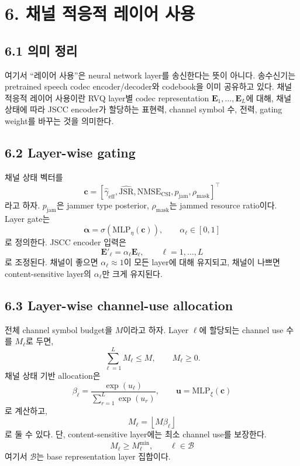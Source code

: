 \documentclass[11pt,a4paper]{article}
\begin{document}
\section{6. 채널 적응적 레이어 사용}

\subsection{6.1 의미 정리}
여기서 ``레이어 사용''은 neural network layer를 송신한다는 뜻이 아니다. 송수신기는 pretrained speech codec encoder/decoder와 codebook을 이미 공유하고 있다. 채널 적응적 레이어 사용이란 RVQ layer별 codec representation $\bm{E}_1,\ldots,\bm{E}_L$에 대해, 채널 상태에 따라 JSCC encoder가 할당하는 표현력, channel symbol 수, 전력, gating weight를 바꾸는 것을 의미한다.

\subsection{6.2 Layer-wise gating}
채널 상태 벡터를
\begin{equation}
    \bm{c}=[\hat{\gamma}_{\mathrm{eff}},\widehat{\mathrm{JSR}},\mathrm{NMSE}_{\mathrm{CSI}},p_{\mathrm{jam}},\rho_{\mathrm{mask}}]^{\top}
\end{equation}
라고 하자. $p_{\mathrm{jam}}$은 jammer type posterior, $\rho_{\mathrm{mask}}$는 jammed resource ratio이다. Layer gate는
\begin{equation}
    \bm{\alpha}=\sigma\left(\mathrm{MLP}_{\eta}(\bm{c})\right), \qquad \alpha_{\ell}\in[0,1]
\end{equation}
로 정의한다. JSCC encoder 입력은
\begin{equation}
    \bm{E}'_{\ell}=\alpha_{\ell}\bm{E}_{\ell}, \qquad \ell=1,\ldots,L
\end{equation}
로 조정된다. 채널이 좋으면 $\alpha_{\ell}\approx 1$이 모든 layer에 대해 유지되고, 채널이 나쁘면 content-sensitive layer의 $\alpha_{\ell}$만 크게 유지된다.

\subsection{6.3 Layer-wise channel-use allocation}
전체 channel symbol budget을 $M$이라고 하자. Layer $\ell$에 할당되는 channel use 수를 $M_{\ell}$로 두면,
\begin{equation}
    \sum_{\ell=1}^{L}M_{\ell}\le M, \qquad M_{\ell}\ge 0.
\end{equation}
채널 상태 기반 allocation은
\begin{equation}
    \beta_{\ell}=\frac{\exp(u_{\ell})}{\sum_{r=1}^{L}\exp(u_r)}, \qquad
    \bm{u}=\mathrm{MLP}_{\xi}(\bm{c})
\end{equation}
로 계산하고,
\begin{equation}
    M_{\ell}=\left\lfloor M\beta_{\ell}\right\rfloor
\end{equation}
로 둘 수 있다. 단, content-sensitive layer에는 최소 channel use를 보장한다.
\begin{equation}
    M_{\ell}\ge M_{\ell}^{\min}, \qquad \ell\in\mathcal{B}
\end{equation}
여기서 $\mathcal{B}$는 base representation layer 집합이다.
\end{document}
